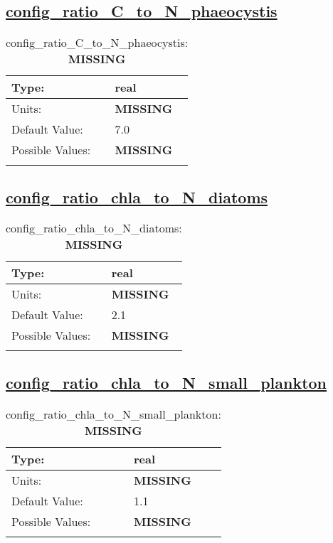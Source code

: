 \subsection[config\_ratio\_C\_to\_N\_phaeocystis]{\hyperref[sec:nm_tab_biogeochemistry]{config\_ratio\_C\_to\_N\_phaeocystis}}
\label{subsec:nm_sec_config_ratio_C_to_N_phaeocystis}
\begin{center}
\begin{longtable}{| p{2.0in} || p{4.0in} |}
    \hline
    Type: & real \\
    \hline
    Units: & {\bf \color{red} MISSING} \\
    \hline
    Default Value: & 7.0 \\
    \hline
    Possible Values: & {\bf \color{red} MISSING} \\
    \hline
    \caption{config\_ratio\_C\_to\_N\_phaeocystis: {\bf \color{red} MISSING}}
\end{longtable}
\end{center}
\subsection[config\_ratio\_chla\_to\_N\_diatoms]{\hyperref[sec:nm_tab_biogeochemistry]{config\_ratio\_chla\_to\_N\_diatoms}}
\label{subsec:nm_sec_config_ratio_chla_to_N_diatoms}
\begin{center}
\begin{longtable}{| p{2.0in} || p{4.0in} |}
    \hline
    Type: & real \\
    \hline
    Units: & {\bf \color{red} MISSING} \\
    \hline
    Default Value: & 2.1 \\
    \hline
    Possible Values: & {\bf \color{red} MISSING} \\
    \hline
    \caption{config\_ratio\_chla\_to\_N\_diatoms: {\bf \color{red} MISSING}}
\end{longtable}
\end{center}
\subsection[config\_ratio\_chla\_to\_N\_small\_plankton]{\hyperref[sec:nm_tab_biogeochemistry]{config\_ratio\_chla\_to\_N\_small\_plankton}}
\label{subsec:nm_sec_config_ratio_chla_to_N_small_plankton}
\begin{center}
\begin{longtable}{| p{2.0in} || p{4.0in} |}
    \hline
    Type: & real \\
    \hline
    Units: & {\bf \color{red} MISSING} \\
    \hline
    Default Value: & 1.1 \\
    \hline
    Possible Values: & {\bf \color{red} MISSING} \\
    \hline
    \caption{config\_ratio\_chla\_to\_N\_small\_plankton: {\bf \color{red} MISSING}}
\end{longtable}
\end{center}
